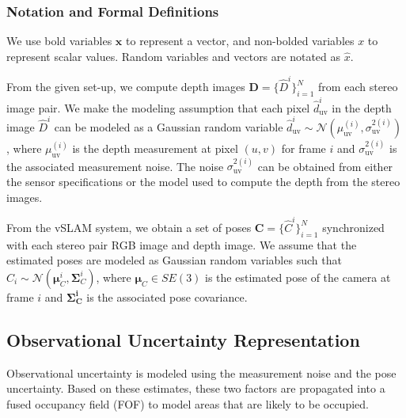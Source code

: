 \subsubsection{Notation and Formal Definitions}
We use bold variables $\boldsymbol{x}$ to represent a vector, and non-bolded variables $x$ to represent scalar values.
Random variables and vectors are notated as $\widehat{x}$.

From the given set-up, we compute depth images $\mathbf{D} = \{\widehat{D}^i\}_{i=1}^N$ from each stereo image pair. 
We make the modeling assumption that each pixel $\widehat{d}_{\text{uv}}^i$ in the depth image $\widehat{D}^i$ can be modeled as a Gaussian random variable $\widehat{d}_{\text{uv}}^i \sim \mathcal{N}(\mu_\text{uv}^{(i)}, \sigma^{2(i)}_\text{uv})$, where $\mu_\text{uv}^{(i)}$ is the depth measurement at pixel $(u,v)$ for frame $i$ and $\sigma^{2(i)}_{\text{uv}}$ is the associated measurement noise.
The noise $\sigma^{2(i)}_{\text{uv}}$ can be obtained from either the sensor specifications or the model used to compute the depth from the stereo images. 

From the vSLAM system, we obtain a set of poses $\mathbf{C} = \{\widehat{C}^i\}_{i=1}^N$ synchronized with each stereo pair RGB image and depth image.
We assume that the estimated poses are modeled as Gaussian random variables such that $\widehat{C}_i \sim \mathcal{N}(\boldsymbol{\mu}_C^i, \mathbf{\Sigma}_C^i)$, where $\boldsymbol{\mu}_C \in SE(3)$ is the estimated pose of the camera at frame $i$ and $\mathbf{\Sigma_C^i}$ is the associated pose covariance.

\subsection{Observational Uncertainty Representation}\label{ss:observational_unc}
Observational uncertainty is modeled using the measurement noise and the pose uncertainty.
Based on these estimates, these two factors are propagated into a fused occupancy field (FOF) to model areas that are likely to be occupied.

